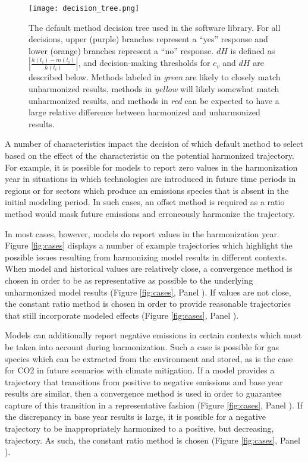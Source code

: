 \begin{figure}
  \begin{center}
    \texttt{[image: decision\_tree.png]}
    \caption[]{
      \label{fig:decision_tree}
      The default method decision tree used in the  software
      library. For all decisions, upper (purple) branches represent a ``yes''
      response and lower (orange) branches represent a ``no'' response. $dH$ is
      defined as $\left|\frac{h(t_i) - m(t_i)}{h(t_i)}\right|$, and
      decision-making thresholds for $c_v$ and $dH$ are described below. Methods
      labeled in \textit{green} are likely to closely match unharmonized
      results, methods in \textit{yellow} will likely somewhat match
      unharmonized results, and methods in \textit{red} can be expected to have
      a large relative difference between harmonized and unharmonized results.}
  \end{center}
\end{figure}

A number of characteristics impact the decision of which default method to
select based on the effect of the characteristic on the potential harmonized
trajectory. For example, it is possible for models to report zero values in the
harmonization year in situations in which technologies are introduced in future
time periods in regions or for sectors which produce an emissions species that
is absent in the initial modeling period. In such cases, an offset method is
required as a ratio method would mask future emissions and erroneously harmonize
the trajectory. 

In most cases, however, models do report values in the harmonization
year. Figure \ref{fig:cases} displays a number of example trajectories which
highlight the possible issues resulting from harmonizing model results in
different contexts. When model and historical values are relatively close, a
convergence method is chosen in order to be as representative as possible to the
underlying unharmonized model results (Figure \ref{fig:cases}, Panel
). If values are not close, the constant ratio method is chosen in order
to provide reasonable trajectories that still incorporate modeled effects
(Figure \ref{fig:cases}, Panel ). 

Models can additionally report negative emissions in certain contexts which must
be taken into account during harmonization. Such a case is possible for gas
species which can be extracted from the environment and stored, as is the case
for CO2 in future scenarios with climate mitigation. If a model provides a
trajectory that transitions from positive to negative emissions and base year
results are similar, then a convergence method is used in order to guarantee
capture of this transition in a representative fashion (Figure \ref{fig:cases},
Panel ). If the discrepancy in base year results is large, it is
possible for a negative trajectory to be inappropriately harmonized to a
positive, but decreasing, trajectory. As such, the constant ratio method is
chosen (Figure \ref{fig:cases}, Panel ).

